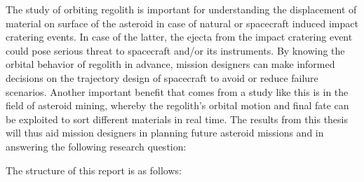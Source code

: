 %
\newline\newline
%
The study of orbiting regolith is important for understanding the displacement of material on surface of the asteroid in case of natural or spacecraft induced impact cratering events. In case of the latter, the ejecta from the impact cratering event could pose serious threat to spacecraft and/or its instruments. By knowing the orbital behavior of regolith in advance, mission designers can make informed decisions on the trajectory design of spacecraft to avoid or reduce failure scenarios. Another important benefit that comes from a study like this is in the field of asteroid mining, whereby the regolith's orbital motion and final fate can be exploited to sort different materials in real time. The results from this thesis will thus aid mission designers in planning future asteroid missions and in answering the following research question:
\begin{center}
\end{center}
\vspace{1cm}
The structure of this report is as follows:

